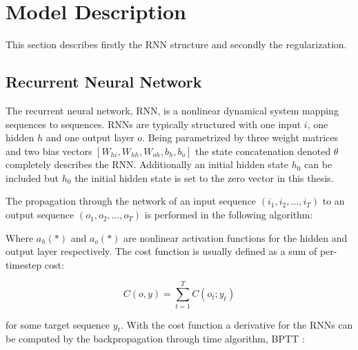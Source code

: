 \chapter{Model Description}

This section describes firstly the RNN structure and secondly the regularization.

\section{Recurrent Neural Network}

The recurrent neural network, RNN, is a nonlinear dynamical system mapping sequences to sequences. RNNs are typically structured with one input $i$, one hidden $h$ and one output layer $o$. Being parametrized by three weight matrices and two bias vectors \([W_{hi}, W_{hh}, W_{oh}, b_h, b_o]\) the state concatenation denoted \(\theta\) completely describes the RNN. Additionally an initial hidden state $h_0$ can be included but $h_0$ the initial hidden state is set to the zero vector in this thesis.

The propagation through the network of an input sequence \((i_1, i_2, ... , i_T)\) to an output sequence \((o_1, o_2, ..., o_T) \) is performed in the following algorithm:

\begin{algorithmic}[1]
    \EndFor
\end{algorithmic}

Where $ a_h(*)$ and $a_o(*)$ are nonlinear activation functions for the hidden and output layer respectively. The cost function is usually defined as a sum of per-timestep cost:

\[C(o, y) = \sum_{t=1}^{T}C(o_t; y_t)\]

for some target sequence $y_t$. With the cost function a derivative for the RNNs can be computed by the backpropagation through time algorithm, BPTT \cite{RNN1}:

\begin{algorithmic}[1]
    \EndFor
    \State {}
\end{algorithmic}

